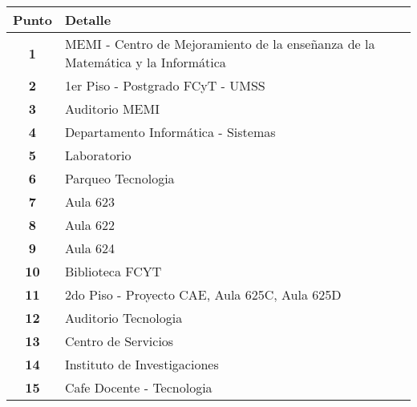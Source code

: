     \begin{longtable}{ c  X }
      \toprule
        \textbf{Punto} &
        \textbf{Detalle}\\

      \midrule
      \endhead

    \textbf{1}
    &
    MEMI - Centro  de Mejoramiento de la enseñanza  de la Matemática y la Informática
    \\

      \textbf{2}
      &
        1{\tiny er} Piso - Postgrado FCyT - UMSS
      \\

      \textbf{3}
      &
      Auditorio MEMI
      \\

      \textbf{4}
      &
      Departamento Informática - Sistemas
      \\

      \textbf{5}
      &
      Laboratorio
      \\

      \textbf{6}
      &
      Parqueo Tecnologia
      \\

      \textbf{7}
      &
      Aula 623
      \\


      \textbf{8}
      &
      Aula 622
      \\

      \textbf{9}
      &
      Aula 624
      \\

      \textbf{10}
      &
      Biblioteca FCYT
      \\

      \textbf{11}
      &
      2{\tiny do} Piso - Proyecto CAE, Aula 625C, Aula 625D
      \\

      \textbf{12}
      &
      Auditorio Tecnologia
      \\

      \textbf{13}
      &
      Centro de Servicios
      \\

      \textbf{14}
      &
      Instituto de Investigaciones
      \\


      \textbf{15}
      &
      Cafe Docente - Tecnologia
      \\


\end{longtable}
